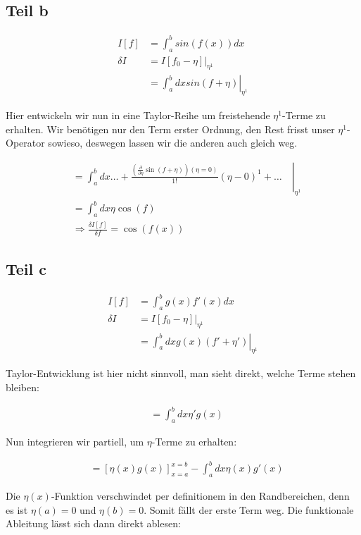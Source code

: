 \documentclass[a4paper,german,12pt,smallheadings]{scrartcl}
\begin{document}
\subsection*{Teil b}

\begin{align*}
  I[f] &= \int_a^b sin(f(x)) dx \\
  \delta I &= \left.I[f_0 - \eta]\right|_{\eta^1} \\
  &=\left.\int_a^b dx sin(f+\eta) \right|_{\eta^1}
\end{align*}

Hier entwickeln wir nun in eine Taylor-Reihe um freistehende $\eta^1$-Terme zu
erhalten. Wir benötigen nur den Term erster Ordnung, den Rest frisst unser
$\eta^1$-Operator sowieso, deswegen lassen wir die anderen auch gleich weg.

\begin{align*}
  &=\left.\int_a^b dx \dots + \frac{\left(\frac{\partial}{\partial \eta} \sin(f+\eta)\right)(\eta=0)}{1!} (\eta - 0)^1 + \dots\quad\right|_{\eta^1} \\
  &=\int_a^b dx \eta \cos(f) \\
  &\Rightarrow \frac{\delta I[f]}{\delta f} = \cos(f(x))
\end{align*}

\subsection*{Teil c}
\begin{align*}
  I[f] &= \int_a^b g(x)f'(x) dx \\
  \delta I &= \left.I[f_0 - \eta]\right|_{\eta^1} \\
  &=\left.\int_a^b dx g(x)(f' + \eta') \right|_{\eta^1}
\end{align*}

Taylor-Entwicklung ist hier nicht sinnvoll, man sieht direkt, welche Terme stehen bleiben:

\begin{align*}
  &=\int_a^b dx \eta' g(x)
\end{align*}

Nun integrieren wir partiell, um $\eta$-Terme zu erhalten:

\begin{align*}
  &=\left[\eta(x) g(x)\right]_{x=a}^{x=b} - \int_a^b dx \eta(x) g'(x)
\end{align*}

Die $\eta(x)$-Funktion verschwindet per definitionem in den Randbereichen, denn
es ist $\eta(a) = 0$ und $\eta(b) = 0$. Somit fällt der erste Term weg. Die
funktionale Ableitung lässt sich dann direkt ablesen:
\end{document}
